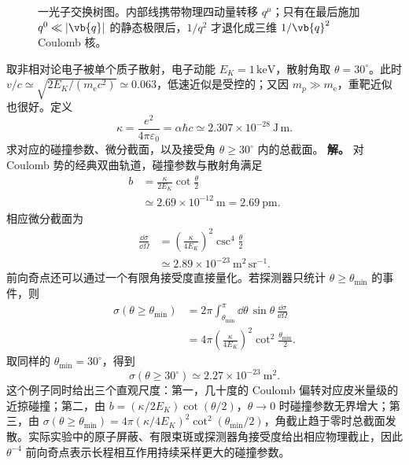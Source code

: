 \begin{figure}[htbp]
 \centering
 
 \caption{一光子交换树图。内部线携带物理四动量转移 $q^\mu$；只有在最后施加 $q^0\ll|\vb{q}|$ 的静态极限后，$1/q^2$ 才退化成三维 $1/\vb{q}^2$ Coulomb 核。}
 \label{fig:qed-exchange-r13}
\end{figure}

\begin{exbox}
取非相对论电子被单个质子散射，电子动能 $E_K=1\,\mathrm{keV}$，散射角取 $\theta=30^\circ$。此时 $v/c\simeq\sqrt{2E_K/(m_{\mathrm e} c^2)}\simeq0.063$，低速近似是受控的；又因 $m_p\gg m_{\mathrm e}$，重靶近似也很好。定义
\begin{equation*}
 \kappa=\frac{e^2}{4\pi\varepsilon_0}=\alpha\hbar c
 \simeq2.307\times10^{-28}\ \mathrm{J\,m}.
\end{equation*}
求对应的碰撞参数、微分截面，以及接受角 $\theta\ge30^\circ$ 内的总截面。
\textbf{解。} 对 Coulomb 势的经典双曲轨道，碰撞参数与散射角满足
\begin{align*}
 b
 &=\frac{\kappa}{2E_K}\cot\frac\theta2\\
 &\simeq2.69\times10^{-12}\ \mathrm m
 =2.69\ \mathrm{pm}.
\end{align*}
相应微分截面为
\begin{align*}
 \frac{\dd\sigma}{\dd\Omega}
 &=\left(\frac{\kappa}{4E_K}\right)^2
 \csc^4\frac\theta2\\
 &\simeq2.89\times10^{-23}\ \mathrm{m^2\,sr^{-1}}.
\end{align*}
前向奇点还可以通过一个有限角接受度直接量化。若探测器只统计 $\theta\ge\theta_{\min}$ 的事件，则
\begin{align*}
 \sigma(\theta\ge\theta_{\min})
 &=2\pi\int_{\theta_{\min}}^\pi
   \dd\theta\,\sin\theta\,
   \frac{\dd\sigma}{\dd\Omega}\\
 &=4\pi\left(\frac{\kappa}{4E_K}\right)^2
   \cot^2\frac{\theta_{\min}}2.
\end{align*}
取同样的 $\theta_{\min}=30^\circ$，得到
\[
 \sigma(\theta\ge30^\circ)
 \simeq2.27\times10^{-23}\ \mathrm m^2.
\]
这个例子同时给出三个直观尺度：第一，几十度的 Coulomb 偏转对应皮米量级的近掠碰撞；第二，由 $b=(\kappa/2E_K)\cot(\theta/2)$，$\theta\to0$ 时碰撞参数无界增大；第三，由 $\sigma(\theta\ge\theta_{\min})=4\pi(\kappa/4E_K)^2\cot^2(\theta_{\min}/2)$，角截止趋于零时总截面发散。实际实验中的原子屏蔽、有限束斑或探测器角接受度给出相应物理截止，因此 $\theta^{-4}$ 前向奇点表示长程相互作用持续采样更大的碰撞参数。
\end{exbox}

